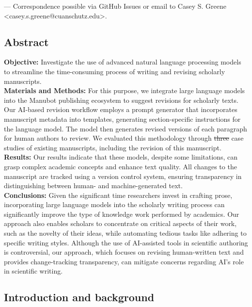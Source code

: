 \documentclass[
]{article}
\providecommand{\DIFaddtex}[1]{{\protect\color{blue}\uwave{#1}}} %
\providecommand{\DIFdeltex}[1]{{\protect\color{red}\sout{#1}}}                      %
\providecommand{\DIFaddbegin}{} %
\providecommand{\DIFaddend}{} %
\providecommand{\DIFdelbegin}{} %
\providecommand{\DIFdelend}{} %
\providecommand{\DIFadd}[1]{\texorpdfstring{\DIFaddtex{#1}}{#1}} %
\providecommand{\DIFdel}[1]{\texorpdfstring{\DIFdeltex{#1}}{}} %
\newcommand{\DIFscaledelfig}{0.5}
\newlength{\DIFdelgraphicswidth} %
\newlength{\DIFdelgraphicsheight} %
\newcommand{\DIFaddincludegraphics}[2][]{{\color{blue}\fbox{\DIFOincludegraphics[#1]{#2}}}} %
\newcommand{\DIFdelincludegraphics}[2][]{%
\sbox{\DIFdelgraphicsbox}{\DIFOincludegraphics[#1]{#2}}%
\settoboxwidth{\DIFdelgraphicswidth}{\DIFdelgraphicsbox} %
\settoboxtotalheight{\DIFdelgraphicsheight}{\DIFdelgraphicsbox} %
\scalebox{\DIFscaledelfig}{%
\parbox[b]{\DIFdelgraphicswidth}{\usebox{\DIFdelgraphicsbox}\\[-\baselineskip] \rule{\DIFdelgraphicswidth}{0em}}\llap{\resizebox{\DIFdelgraphicswidth}{\DIFdelgraphicsheight}{%
\setlength{\unitlength}{\DIFdelgraphicswidth}%
\begin{picture}(1,1)%
\thicklines\linethickness{2pt} %
{\color[rgb]{1,0,0}\put(0,0){\framebox(1,1){}}}%
{\color[rgb]{1,0,0}\put(0,0){\line( 1,1){1}}}%
{\color[rgb]{1,0,0}\put(0,1){\line(1,-1){1}}}%
\end{picture}%
}\hspace*{3pt}}} %
} %
\DeclareRobustCommand{\DIFaddbegin}{\DIFOaddbegin \let\includegraphics\DIFaddincludegraphics} %
\DeclareRobustCommand{\DIFaddend}{\DIFOaddend \let\includegraphics\DIFOincludegraphics} %
\DeclareRobustCommand{\DIFdelbegin}{\DIFOdelbegin \let\includegraphics\DIFdelincludegraphics} %
\DeclareRobustCommand{\DIFdelend}{\DIFOaddend \let\includegraphics\DIFOincludegraphics} %
\begin{document}
\leavevmode{}%
\Letter --- Correspondence possible via GitHub Issues
or email to
Casey S. Greene \textless casey.s.greene@cuanschutz.edu\textgreater.

\subsection{Abstract}

\textbf{Objective:} Investigate the use of advanced natural language processing models to streamline the time-consuming process of writing and revising scholarly manuscripts.\\
\textbf{Materials and Methods:} For this purpose, we integrate large language models into the Manubot publishing ecosystem to suggest revisions for scholarly texts.
Our AI-based revision workflow employs a prompt generator that incorporates manuscript metadata into templates, generating section-specific instructions for the language model.
The model then generates revised versions of each paragraph for human authors to review.
We evaluated this methodology through \DIFdelbegin \DIFdel{three }\DIFdelend \DIFaddbegin \DIFadd{five }\DIFaddend case studies of existing manuscripts, including the revision of this manuscript.\\
\textbf{Results:} Our results indicate that these models, despite some limitations, can grasp complex academic concepts and enhance text quality.
All changes to the manuscript are tracked using a version control system, ensuring transparency in distinguishing between human- and machine-generated text.\\
\textbf{Conclusions:} Given the significant time researchers invest in crafting prose, incorporating large language models into the scholarly writing process can significantly improve the type of knowledge work performed by academics.
Our approach also enables scholars to concentrate on critical aspects of their work, such as the novelty of their ideas, while automating tedious tasks like adhering to specific writing styles.
Although the use of AI-assisted tools in scientific authoring is controversial, our approach, which focuses on revising human-written text and provides change-tracking transparency, can mitigate concerns regarding AI's role in scientific writing.

\subsection{Introduction and background}
\end{document}

